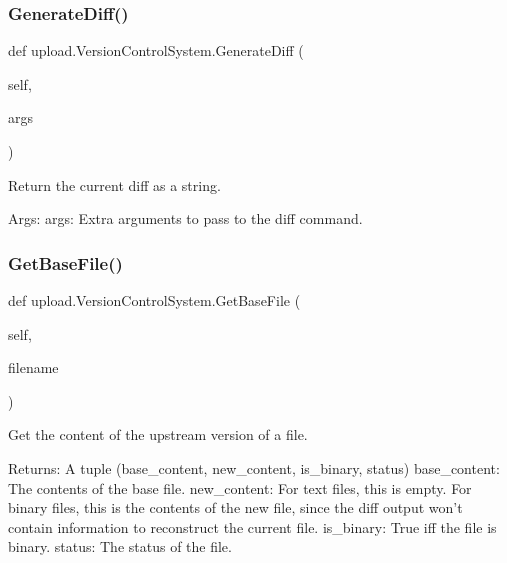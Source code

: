\subsubsection{\texorpdfstring{Generate\+Diff()}{GenerateDiff()}\hspace{0.1cm}{\footnotesize\ttfamily [2/2]}}
{\footnotesize\ttfamily def upload.\+Version\+Control\+System.\+Generate\+Diff (\begin{DoxyParamCaption}\item[{}]{self,  }\item[{}]{args }\end{DoxyParamCaption})}

\begin{DoxyVerb}Return the current diff as a string.

Args:
  args: Extra arguments to pass to the diff command.
\end{DoxyVerb}
 \mbox{\label{classupload_1_1_version_control_system_adfd9d4ecba422102233a2ba13e5bfaf5}} 
\subsubsection{\texorpdfstring{Get\+Base\+File()}{GetBaseFile()}\hspace{0.1cm}{\footnotesize\ttfamily [1/2]}}
{\footnotesize\ttfamily def upload.\+Version\+Control\+System.\+Get\+Base\+File (\begin{DoxyParamCaption}\item[{}]{self,  }\item[{}]{filename }\end{DoxyParamCaption})}

\begin{DoxyVerb}Get the content of the upstream version of a file.

Returns:
  A tuple (base_content, new_content, is_binary, status)
base_content: The contents of the base file.
new_content: For text files, this is empty.  For binary files, this is
  the contents of the new file, since the diff output won't contain
  information to reconstruct the current file.
is_binary: True iff the file is binary.
status: The status of the file.
\end{DoxyVerb}
 \mbox{\label{classupload_1_1_version_control_system_adfd9d4ecba422102233a2ba13e5bfaf5}} 
